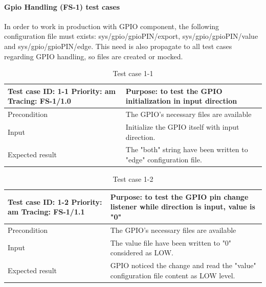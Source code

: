 \paragraph{Gpio Handling (FS-1) test cases} In order to work in production with GPIO component, the following configuration file must exists: sys/gpio/gpioPIN/export, sys/gpio/gpioPIN/value and sys/gpio/gpioPIN/edge. This need is also propagate to all test cases regarding GPIO handling, so files are created or mocked.
\begin{table}[H]
	\caption{Test case 1-1}
	\label{table:TCase-FS1-1}
	\begin{center}
		\renewcommand{\arraystretch}{1.8}
		\begin{tabu} 
			to 0.9 \textwidth
			{  X[0.4, c] X[c] }
			\toprule
			Test case ID: 1-1 \newline Priority: am \newline Tracing: FS-1/1.0 & Purpose: to test the GPIO initialization in input direction       \\ \midrule
			Precondition                                                       & The GPIO's necessary files are available                          \\
			Input                                                              & Initialize the GPIO itself with input direction.                  \\
			Expected result                                                    & The "both" string have been written to "edge" configuration file. \\ \bottomrule
		\end{tabu}
	\end{center}
\end{table} 

\begin{table}[H]
	\caption{Test case 1-2}
	\label{table:TCase-FS1-2}
	\begin{center}
		\renewcommand{\arraystretch}{1.8}
		\begin{tabu} 
			to 0.9 \textwidth
			{  X[0.4, c] X[c] }
			\toprule
			Test case ID: 1-2 \newline Priority: am \newline Tracing: FS-1/1.1 & Purpose: to test the GPIO pin change listener while direction is input, value is "0"  \\ \midrule
			Precondition                                                       & The GPIO's necessary files are available                                              \\
			Input                                                              & The value file have been written to "0" considered as LOW.                            \\
			Expected result                                                    & GPIO noticed the change and read the "value" configuration file content as LOW level. \\ \bottomrule
		\end{tabu}
	\end{center}
\end{table} 


